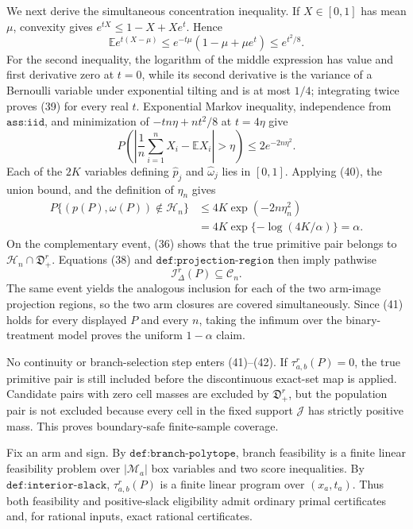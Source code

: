 We next derive the simultaneous concentration inequality.  If \(X\in[0,1]\) has mean \(\mu\), convexity gives \(e^{tX}\le1-X+Xe^t\).  Hence
\[
 \mathbb E e^{t(X-\mu)}
 \le e^{-t\mu}(1-\mu+\mu e^t)
 \le e^{t^2/8}.                                                               \tag{39}
\]
For the second inequality, the logarithm of the middle expression has value and first derivative zero at \(t=0\), while its second derivative is the variance of a Bernoulli variable under exponential tilting and is at most \(1/4\); integrating twice proves (39) for every real \(t\).  Exponential Markov inequality, independence from \(\texttt{ass:iid}\), and minimization of \(-tn\eta+nt^2/8\) at \(t=4\eta\) give
\[
 P\!\left(\left|\frac1n\sum_{i=1}^nX_i-\mathbb EX_i\right|>\eta\right)
 \le2e^{-2n\eta^2}.                                                          \tag{40}
\]
Each of the \(2K\) variables defining \(\widehat p_j\) and \(\widehat\omega_j\) lies in \([0,1]\).  Applying (40), the union bound, and the definition of \(\eta_n\) gives
\[
 \begin{aligned}
 P\{(p(P),\omega(P))\notin\mathcal H_n\}
 &\le4K\exp(-2n\eta_n^2)\\
 &=4K\exp\{-\log(4K/\alpha)\}=\alpha.                                      \tag{41}
 \end{aligned}
\]
On the complementary event, (36) shows that the true primitive pair belongs to \(\mathcal H_n\cap\mathfrak D_+^r\).  Equations (38) and \(\texttt{def:projection-region}\) then imply pathwise
\[
 \mathcal I_\Delta^r(P)\subseteq\mathcal C_n.                                \tag{42}
\]
The same event yields the analogous inclusion for each of the two arm-image projection regions, so the two arm closures are covered simultaneously.  Since (41) holds for every displayed \(P\) and every \(n\), taking the infimum over the binary-treatment model proves the uniform \(1-\alpha\) claim.

No continuity or branch-selection step enters (41)--(42).  If \(\tau_{a,b}^r(P)=0\), the true primitive pair is still included before the discontinuous exact-set map is applied.  Candidate pairs with zero cell masses are excluded by \(\mathfrak D_+^r\), but the population pair is not excluded because every cell in the fixed support \(\mathcal J\) has strictly positive mass.  This proves boundary-safe finite-sample coverage.

Fix an arm and sign.  By \(\texttt{def:branch-polytope}\), branch feasibility is a finite linear feasibility problem over \(|\mathcal M_a|\) box variables and two score inequalities.  By \(\texttt{def:interior-slack}\), \(\tau_{a,b}^r(P)\) is a finite linear program over \((x_a,t_a)\).  Thus both feasibility and positive-slack eligibility admit ordinary primal certificates and, for rational inputs, exact rational certificates.

